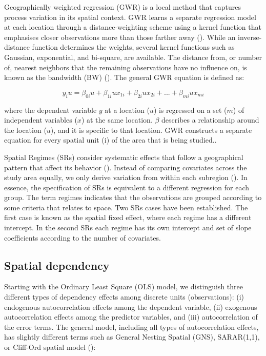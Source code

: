 \documentclass[
  manuscript=article,  
  layout=preprint,  
  year=2023,
  volume=0,
]{format}
\begin{document}
\par Geographically weighted regression (GWR) is a local method that captures process variation in its spatial context. GWR learns a separate regression model at each location through a distance-weighting scheme using a kernel function that emphasises closer observations more than those farther away (\cite{fotheringham2000quantitative}). While an inverse-distance function determines the weights, several kernel functions such as Gaussian, exponential, and bi-square, are available. The distance from, or number of, nearest neighbors that the remaining observations have no influence on, is known as the bandwidth (BW) (\cite{brunsdon1996geographically}). The general GWR equation is defined as:

\begin{equation} \label{eq:1}
    y_iu=\beta_{0i}u+\beta_{1i}ux_{1i}+\beta_{2i}ux_{2i}+...+\beta_{mi}ux_{mi}
\end{equation}

where the dependent variable $y$ at a location ($u$) is regressed on a set ($m$) of independent variables ($x$) at the same location. $\beta$ describes a relationship around the location ($u$), and it is specific to that location. GWR constructs a separate equation for every spatial unit (i) of the area that is being studied..

\par Spatial Regimes (SRs) consider systematic effects that follow a geographical pattern that affect its behavior (\cite{anselin1996simple}). Instead of comparing covariates across the study area equally, we only derive variation from within each subregion (\cite{piras2023heterogeneous}). In essence, the specification of SRs is equivalent to a different regression for each group. The term regimes indicates that the observations are grouped according to some criteria that relates to space. Two SRs cases have been established. The first case is known as the spatial fixed effect, where each regime has a different intercept. In the second SRs each regime has its own intercept and set of slope coefficients according to the number of covariates.

\subsection{Spatial dependency}
\par Starting with the Ordinary Least Square (OLS) model, we distinguish three different types of dependency effects among discrete units (observations): (i) endogenous autocorrelation effects among the dependent variable, (ii) exogenous autocorrelation effects among the predictor variables, and (iii) autocorrelation of the error terms. The general model, including all types of autocorrelation effects, has slightly different terms such as General Nesting Spatial (GNS),  SARAR(1,1), or Cliff-Ord spatial model (\cite{lesage2009introduction, kelejian2007relative, cliff1981spatial}):
\end{document}
